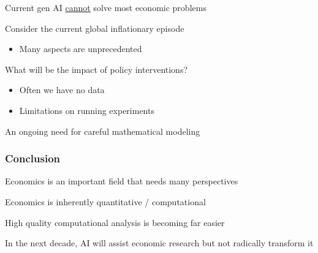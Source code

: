 \documentclass[
    xcolor={svgnames,dvipsnames},
    hyperref={colorlinks, citecolor=DeepPink4, linkcolor=DarkRed, urlcolor=DarkBlue}
    ]{beamer}  %
\newcommand{\1}{\mathbbm 1}
\begin{document}
\begin{frame}
    

    Current gen AI \underline{cannot} solve most economic problems

    \vspace{1em}
    Consider the current global inflationary episode

    \begin{itemize}
        \item Many aspects are unprecedented
    \end{itemize}

    \vspace{1em}
    What will be the impact of policy interventions?

    \begin{itemize}
        \item Often we have no data
            \vspace{0.5em}
        \item Limitations on running experiments
    \end{itemize}

    
    \vspace{1em}
    An ongoing need for careful mathematical modeling

\end{frame}

\begin{frame}
    \frametitle{Conclusion}

    Economics is an important field that needs many perspectives

            \vspace{0.5em}
            \vspace{0.5em}
            \vspace{0.5em}

    Economics is inherently quantitative / computational

            \vspace{0.5em}
            \vspace{0.5em}
            \vspace{0.5em}

    High quality computational analysis is becoming far easier

            \vspace{0.5em}
            \vspace{0.5em}
            \vspace{0.5em}

    In the next decade, AI will assist economic research but not radically transform it

\end{frame}
\end{document}
